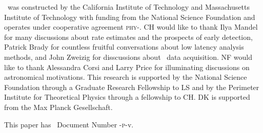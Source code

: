 \documentclass[preprint2]{aastex}
\begin{document}
\acknowledgements

\LIGO\ was constructed by the California Institute of Technology and
Massachusetts Institute of Technology with funding from the National Science
Foundation and operates under cooperative agreement
\textsc{phy}-.  CH would like to thank Ilya Mandel for
many discussions about rate estimates and the prospects of early detection,
Patrick Brady for countless fruitful conversations about
low latency analysis methods, and John Zweizig for
disscussions about \LIGO\ data acquisition.  NF would like to thank Alessandra
Corsi and Larry Price for illuminating discussions on astronomical motivations.
This research
is supported by the National Science Foundation through a Graduate Research
Fellowship to LS and by the Perimeter Institute for Theoretical Physics through
a fellowship to CH. DK is supported from the Max Planck Gesellschaft. 

This paper has \LIGO\ Document Number \LIGO-\textsc{p}-v.



\end{document}
